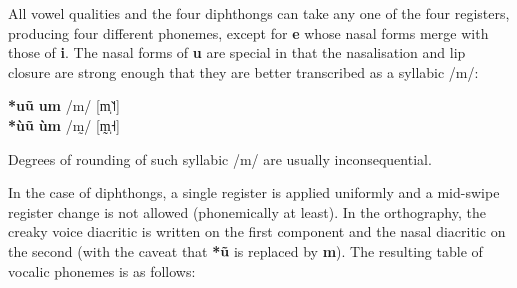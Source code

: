\documentclass[11pt]{book}
\newcommand{\qcn}[1]{\textbf{#1}}
\begin{document}
All vowel qualities and the four diphthongs can take any one of the four registers, producing four different phonemes, except for \qcn{e} whose nasal forms merge with those of \qcn{i}. The nasal forms of \qcn{u} are special in that the nasalisation and lip closure are strong enough that they are better transcribed as a syllabic /m/:

\begin{center}
	\qcn{*uũ} \textrightarrow \qcn{um} \textrightarrow /m/ [m̩˥˦] \\
	\qcn{*ùũ} \textrightarrow \qcn{ùm} \textrightarrow /m̰/ [m̩̰˧]\\
\end{center}

Degrees of rounding of such syllabic /m/ are usually inconsequential.

 In the case of diphthongs, a single register is applied uniformly and a mid-swipe register change is not allowed (phonemically at least). In the orthography, the creaky voice diacritic is written on the first component and the nasal diacritic on the second (with the caveat that \qcn{*ũ} is replaced by \qcn{m}). The resulting table of vocalic phonemes is as follows:
%
\end{document}
